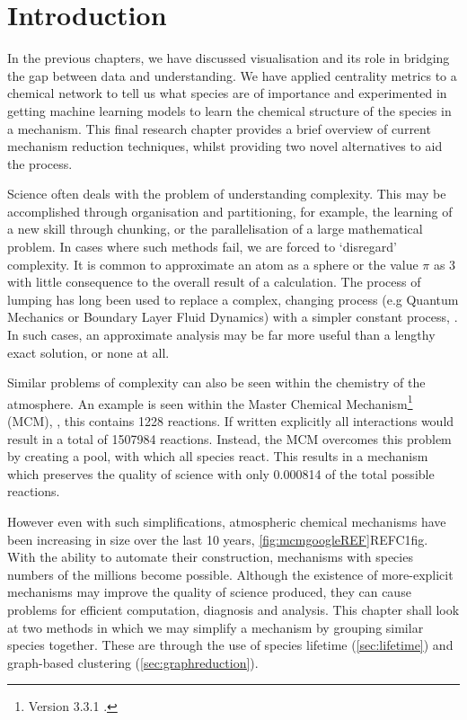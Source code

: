 

\section{Introduction}

In the previous chapters, we have discussed visualisation and its role in bridging the gap between data and understanding. We have applied centrality metrics to a chemical network to tell us what species are of importance and experimented in getting machine learning models to learn the chemical structure of the species in a mechanism. This final research chapter provides a brief overview of current mechanism reduction techniques, whilst providing two novel alternatives to aid the process.

Science often deals with the problem of understanding complexity. This may be accomplished through organisation and partitioning, for example, the learning of a new skill through chunking, or the parallelisation of a large mathematical problem. In cases where such methods fail, we are forced to `disregard' complexity. It is common to approximate an atom as a sphere or the value $\pi$ as 3 with little consequence to the overall result of a calculation. The process of lumping has long been used to replace a complex, changing process (e.g Quantum Mechanics or Boundary Layer Fluid Dynamics) with a simpler constant process, \citep{approx}. In such cases, an approximate analysis may be far more useful than a lengthy exact solution, or none at all. 

Similar problems of complexity can also be seen within the chemistry of the atmosphere. An example is seen within the Master Chemical Mechanism\footnote{Version 3.3.1 .} (MCM), \citep{mcm}, this contains 1228  reactions. If written explicitly all  interactions would result in a total of 1507984 reactions. Instead, the MCM overcomes this problem by creating a  pool, with which all  species react. This results in a mechanism which preserves the quality of science with only 0.000814 of the total possible  reactions.

However even with such simplifications, atmospheric chemical mechanisms have been increasing in size over the last 10 years, \autoref{fig:mcmgoogleREF}REFC1fig. With the ability to automate their construction, mechanisms with species numbers of the millions become possible. Although the existence of more-explicit mechanisms may improve the quality of science produced, they can cause problems for efficient computation, diagnosis and analysis. This chapter shall look at two methods in which we may simplify a mechanism by grouping similar species together. These are through the use of species lifetime (\autoref{sec:lifetime}) and graph-based clustering (\autoref{sec:graphreduction}).




